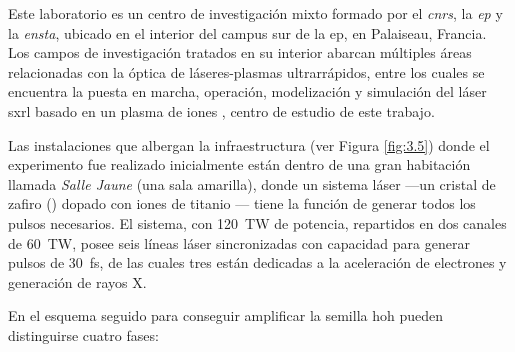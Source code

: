 Este laboratorio es un centro de investigación mixto formado por el \emph{\acrfull{cnrs}}, la \emph{\acrfull{ep}} y la \emph{\acrfull{ensta}}, ubicado en el interior del campus sur de la \acrshort{ep}, en Palaiseau, Francia. Los campos de investigación tratados en su interior abarcan múltiples áreas relacionadas con la óptica de láseres-plasmas ultrarrápidos, entre los cuales se encuentra la puesta en marcha, operación, modelización y simulación del láser \acrshort{sxrl} basado en un plasma de iones , centro de estudio de este trabajo.

Las instalaciones que albergan la infraestructura (ver Figura \ref{fig:3.5}) donde el experimento fue realizado inicialmente están dentro de una gran habitación llamada \emph{Salle Jaune} (una sala amarilla), donde un sistema láser  ---un cristal de zafiro () dopado con iones de titanio --- tiene la función de generar todos los pulsos necesarios. El sistema, con \qty{120}{TW} de potencia, repartidos en dos canales de \qty{60}{TW}, posee seis líneas láser sincronizadas con capacidad para generar pulsos de \qty{30}{fs}, de las cuales tres están dedicadas a la aceleración de electrones y generación de rayos X.

En el esquema seguido para conseguir amplificar la semilla \acrshort{hoh} pueden distinguirse cuatro fases:

